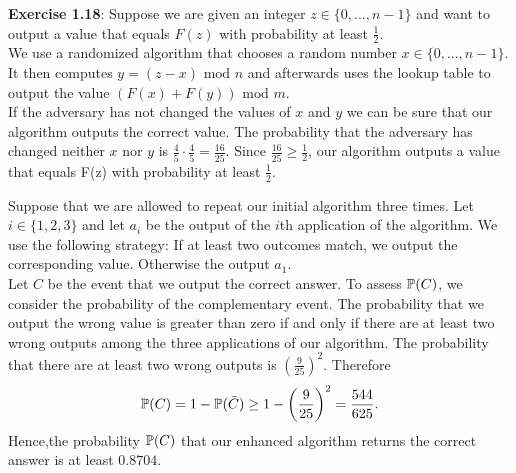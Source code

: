 \textbf{Exercise 1.18}: Suppose we are given an integer $z \in \{ 0, ..., n-1 \}$
and want to output a value that equals $F(z)$ with probability at least
$\frac{1}{2}$. \\
We use a randomized algorithm that chooses a random number $x \in \{ 0, ..., n-1 \}$.
It then computes $y = (z - x) \text{ mod }n$ and afterwards uses the lookup table
to output the value $(F(x) + F(y)) \text{ mod }m$. \\
If the adversary has not changed the values of $x$ and $y$ we can be sure that
our algorithm outputs the correct value. The probability that the adversary has
changed neither $x$ nor $y$ is $\frac{4}{5} \cdot \frac{4}{5} = \frac{16}{25}$.
Since $\frac{16}{25} \geq \frac{1}{2}$, our algorithm outputs a value that equals
F(z) with probability at least $\frac{1}{2}$.

Suppose that we are allowed to repeat our initial algorithm three times. Let $i
\in \{ 1, 2, 3 \}$ and let $a_i$ be the output of the $i$th application of the
algorithm. We use the following strategy: If at least two outcomes match, we output
the corresponding value. Otherwise the output $a_1$.  \\
 Let $C$ be the event that we output the correct answer. To assess $\mathbb{P}(C)$, we
consider the probability of the complementary event. The probability that we
output the wrong value is greater than zero if and only if there are at least
two wrong outputs among the three applications of our algorithm. The probability
that there are at least two wrong outputs is $\left(\frac{9}{25}\right)^2$.
Therefore
\[ \mathbb{P}(C) = 1 - \mathbb{P}(\bar{C})\geq 1 - \left(\frac{9}{25}\right)^2 = \frac{544}{625}.\]
Hence,the probability $\mathbb{P}(C)$ that our enhanced algorithm returns the correct
answer is at least $0.8704$.
\\[0.5cm]
